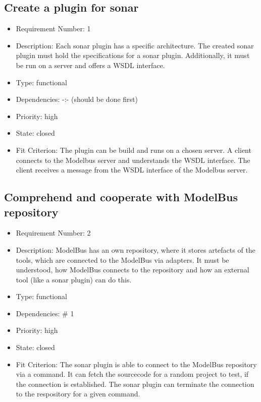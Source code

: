 \subsection{Create a plugin for sonar}
\begin{itemize}
\item Requirement Number: 1
\item Description: Each sonar plugin has a specific architecture. The created sonar plugin must hold the specifications for a sonar plugin. Additionally, it must be run on a server and offers a WSDL interface.
\item Type: functional
\item Dependencies: -:- (should be done first)
\item Priority: high
\item State: closed
\item Fit Criterion: The plugin can be build and runs on a chosen server. A client connects to the Modelbus server and understands the WSDL interface. The client receives a message from the WSDL interface of the Modelbus server.
\end{itemize}

\subsection{Comprehend and cooperate with ModelBus repository}
\begin{itemize}
\item Requirement Number: 2
\item Description: ModelBus has an own repository, where it stores artefacts of the tools, which are connected to the ModelBus via adapters. It must be understood, how ModelBus connects to the repository and how an external tool (like a sonar plugin) can do this.
\item Type: functional
\item Dependencies: \# 1
\item Priority: high
\item State: closed
\item Fit Criterion: The sonar plugin is able to connect to the ModelBus repository via a command. It can fetch the sourcecode for a random project to test, if the connection is established. The sonar plugin can terminate the connection to the respository for a given command.
\end{itemize}

